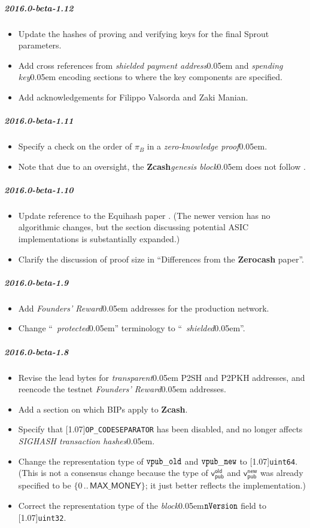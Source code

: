 \documentclass{article}
\let\oldtexttt\texttt
\let\oldmathtt\mathtt
\renewcommand{\texttt}[1]{\scalebox{0.97}[1.07]{\oldtexttt{#1}}}
\renewcommand{\mathtt}[1]{\scalebox{0.97}[1.07]{$\oldmathtt{#1}$}}
\let\oldcite\cite
\renewcommand{\cite}[2][]{\raisebox{0ex}{\oldcite[{#1}]{#2}}}
\newcommand{\introlist}{\needspace{15ex}}
\numberwithin{theorem}{subsection}
\newcommand{\term}[1]{\textsl{#1}\kern 0.05em\xspace}
\newcommand{\termbf}[1]{\textbf{#1}\xspace}
\newcommand{\quotedterm}[1]{``~\!\!\term{#1}''}
\newcommand{\Zcash}{\termbf{Zcash}}
\newcommand{\Zerocash}{\termbf{Zerocash}}
\newcommand{\zeroKnowledgeProof}{\term{zero-knowledge proof}}
\newcommand{\block}{\term{block}}
\newcommand{\genesisBlock}{\term{genesis block}}
\newcommand{\transparent}{\term{transparent}}
\newcommand{\paymentAddress}{\term{shielded payment address}}
\newcommand{\spendingKey}{\term{spending key}}
\newcommand{\setof}[1]{\{{#1}\}}
\newcommand{\barerange}[2]{{{#1}\,..\,{#2}}}
\newcommand{\range}[2]{\setof{\barerange{#1}{#2}}}
\newcommand{\MAXMONEY}{\mathsf{MAX\_MONEY}}
\newcommand{\foundersReward}{\term{Founders' Reward}}
\newcommand{\vpubOldField}{\mathtt{vpub\_old}}
\newcommand{\vpubNewField}{\mathtt{vpub\_new}}
\newcommand{\type}[1]{\texttt{#1}}
\newcommand{\sighashTxHashes}{\term{SIGHASH transaction hashes}}
\newcommand{\ScriptOP}[1]{\texttt{OP\_{#1}}}
\newcommand{\nVersion}{\mathtt{nVersion}}
\newcommand{\Proof}[1]{\pi_{\!{#1}}}
\newcommand{\vpubOld}{\mathsf{v_{pub}^{old}}}
\newcommand{\vpubNew}{\mathsf{v_{pub}^{new}}}
\begin{document}
\introlist
\subparagraph{2016.0-beta-1.12}

\begin{itemize}
    \item Update the hashes of proving and verifying keys for the final Sprout parameters.
    \item Add cross references from \paymentAddress and \spendingKey encoding
          sections to where the key components are specified.
    \item Add acknowledgements for Filippo Valsorda and Zaki Manian.
\end{itemize}

\introlist
\subparagraph{2016.0-beta-1.11}

\begin{itemize}
    \item Specify a check on the order of $\Proof{B}$ in a \zeroKnowledgeProof.
    \item Note that due to an oversight, the \Zcash \genesisBlock does not
          follow \cite{BIP-34}.
\end{itemize}

\introlist
\subparagraph{2016.0-beta-1.10}

\begin{itemize}
    \item Update reference to the Equihash paper \cite{BK2016}. (The newer version
          has no algorithmic changes, but the section discussing potential ASIC
          implementations is substantially expanded.)
    \item Clarify the discussion of proof size in ``Differences from the \Zerocash paper''.
\end{itemize}

\introlist
\subparagraph{2016.0-beta-1.9}

\begin{itemize}
    \item Add \foundersReward addresses for the production network.
    \item Change \quotedterm{protected} terminology to \quotedterm{shielded}.
\end{itemize}

\introlist
\subparagraph{2016.0-beta-1.8}

\begin{itemize}
    \item Revise the lead bytes for \transparent P2SH and P2PKH addresses,
          and reencode the testnet \foundersReward addresses.
    \item Add a section on which BIPs apply to \Zcash.
    \item Specify that \ScriptOP{CODESEPARATOR} has been disabled, and
          no longer affects \sighashTxHashes.
    \item Change the representation type of $\vpubOldField$ and $\vpubNewField$
          to \type{uint64}. (This is not a consensus change because the type of
          $\vpubOld$ and $\vpubNew$ was already specified to be $\range{0}{\MAXMONEY}$;
          it just better reflects the implementation.)
    \item Correct the representation type of the \block $\nVersion$ field to
          \type{uint32}.
\end{itemize}
\end{document}
